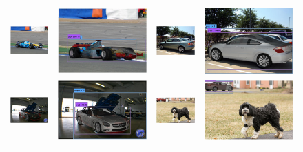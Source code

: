 \documentclass[10pt,twocolumn,letterpaper]{article}
\begin{document}
\begin{figure}[h]
\begin{tabular}{|cc|cc|}
  \includegraphics[width=0.24\linewidth]{supp/pas_car17a.png} &
  \includegraphics[width=0.24\linewidth]{supp/pas_car17b.png} & 
  \includegraphics[width=0.24\linewidth]{supp/pas_car19a.png} &
  \includegraphics[width=0.24\linewidth]{supp/pas_car19b.png} \\
  \includegraphics[width=0.24\linewidth]{supp/pas_car21a.png} &
  \includegraphics[width=0.24\linewidth]{supp/pas_car21b.png} & 
  \includegraphics[width=0.24\linewidth]{supp/pas_car22a.png} &
  \includegraphics[width=0.24\linewidth]{supp/pas_car22b.png} \\

\end{tabular}
\end{figure}
\end{document}
